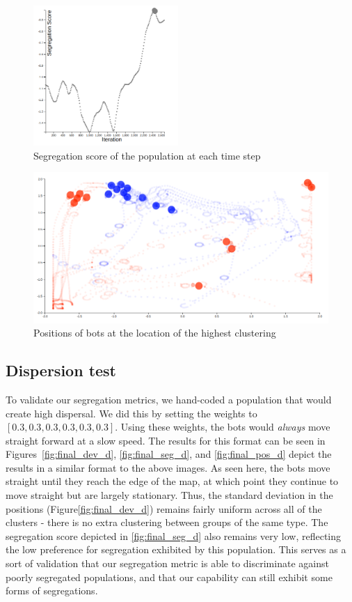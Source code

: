 \begin{figure}
    \centering
    \includegraphics[width=5.5cm]{imgs/final_seg_1.png}
    \caption{Segregation score of the population at each time step}
    \label{fig:final_seg_1}
\end{figure}

\begin{figure}
    \centering
    \includegraphics[width=\linewidth]{imgs/final_place_1.png}
    \caption{Positions of bots at the location of the highest clustering}
    \label{fig:final_pos_1}
\end{figure}

\subsection{Dispersion test}
\label{sec:dispersion}

To validate our segregation metrics, we hand-coded a population that would create high dispersal. 
We did this by setting the weights to $[0.3, 0.3, 0.3, 0.3, 0.3, 0.3]$.
Using these weights, the bots would \emph{always} move straight forward at a slow speed.
The results for this format can be seen in Figures~\ref{fig:final_dev_d}, \ref{fig:final_seg_d}, and \ref{fig:final_pos_d} depict the results in a similar format to the above images. 
As seen here, the bots move straight until they reach the edge of the map, at which point they continue to move straight but are largely stationary. 
Thus, the standard deviation in the positions (Figure\ref{fig:final_dev_d}) remains fairly uniform across all of the clusters - there is no extra clustering between groups of the same type. 
The segregation score depicted in \ref{fig:final_seg_d} also remains very low, reflecting the low preference for segregation exhibited by this population.
This serves as a sort of validation that our segregation metric is able to discriminate against poorly segregated populations, and that our capability can still exhibit some forms of segregations.

